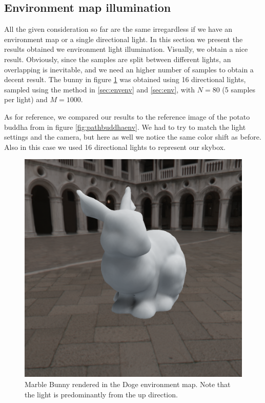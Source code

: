 \subsection{Environment map illumination}

All the given consideration so far are the same irregardless if we have an environment map or a single directional light. In this section we present the results obtained we environment light illumination. Visually, we obtain a nice result. Obviously, since the samples are split between different lights, an overlapping is inevitable, and we need an higher number of samples to obtain a decent result. The bunny in figure \ref{fig:bunnyenv1} was obtained using 16 directional lights, sampled using the method in \ref{sec:envenv} and \ref{sec:env}, with $N = 80$ (5 samples per light) and $M = 1000$. 

As for reference, we compared our results to the reference image of the potato buddha from \cite{IMM2013-06646} in figure \ref{fig:pathbuddhaenv}. We had to try to match the light settings and the camera, but here as well we notice the same color shift as before. Also in this case we used 16 directional lights to represent our skybox.

\begin{figure}[!h]
\centering
\includegraphics[width=0.7 \linewidth]{images/results/bunny_env_80_1000_nobias.png}
\caption{Marble Bunny rendered in the Doge environment map. Note that the light is predominantly from the up direction.}
\label{fig:bunnyenv1}
\end{figure}



